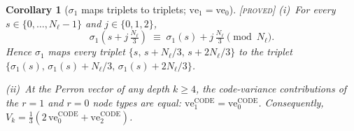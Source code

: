 \documentclass[11pt]{article}
\newtheorem{corollary}[theorem]{Corollary}
\theoremstyle{definition}
\newcommand{\PROVED}{\textup{[\textsc{proved}]}}
\begin{document}
\begin{corollary}[$\sigma_1$ maps triplets to triplets; $\mathrm{ve}_1 = \mathrm{ve}_0$]\label{cor:ve_equality}
\PROVED{}
(i)~For every $s \in \{0,\ldots,N_\ell-1\}$ and $j \in \{0,1,2\}$,
\[
  \sigma_1\!\left(s + j\,\tfrac{N_\ell}{3}\right) \;\equiv\; \sigma_1(s) + j\,\tfrac{N_\ell}{3}
  \pmod{N_\ell}.
\]
Hence $\sigma_1$ maps every triplet $\{s,\,s{+}N_\ell/3,\,s{+}2N_\ell/3\}$
to the triplet $\{\sigma_1(s),\,\sigma_1(s){+}N_\ell/3,\,\sigma_1(s){+}2N_\ell/3\}$.

(ii)~At the Perron vector of any depth $k \ge 4$, the code-variance
contributions of the $r{=}1$ and $r{=}0$ node types are equal:
$\mathrm{ve}_1^{\mathrm{CODE}} = \mathrm{ve}_0^{\mathrm{CODE}}$.
Consequently, $V_k = \tfrac{1}{3}(2\,\mathrm{ve}_0^{\mathrm{CODE}} + \mathrm{ve}_2^{\mathrm{CODE}})$.
\end{corollary}
\end{document}
